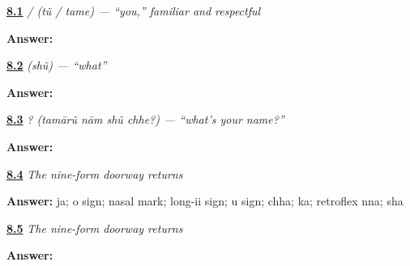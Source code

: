 \noindent\begin{minipage}[t]{\linewidth}
\raggedright
\hyperlink{review-GU-C02-tu-tame-ra-retrieval}{\textbf{8.1}} \emph{ /  (tũ / tame) — \textquotedblleft{}you,\textquotedblright{} familiar and respectful}\par
\small \textbf{Answer:} \par
\end{minipage}\par\medskip

\noindent\begin{minipage}[t]{\linewidth}
\raggedright
\hyperlink{review-GU-C02-shun-da-retrieval}{\textbf{8.2}} \emph{ (shũ) — \textquotedblleft{}what\textquotedblright{}}\par
\small \textbf{Answer:} \par
\end{minipage}\par\medskip

\noindent\begin{minipage}[t]{\linewidth}
\raggedright
\hyperlink{review-GU-C02-tamarun-naam-shun-chhe-va-retrieval}{\textbf{8.3}} \emph{   ? (tamārũ nām shũ chhe?) — \textquotedblleft{}what's your name?\textquotedblright{}}\par
\small \textbf{Answer:} \par
\end{minipage}\par\medskip

\noindent\begin{minipage}[t]{\linewidth}
\raggedright
\hyperlink{review-GU-R04-doorway-nine-r2-reading}{\textbf{8.4}} \emph{The nine-form doorway returns}\par
\small \textbf{Answer:} ja; o sign; nasal mark; long-ii sign; u sign; chha; ka; retroflex nna; sha\par
\end{minipage}\par\medskip

\noindent\begin{minipage}[t]{\linewidth}
\raggedright
\hyperlink{review-GU-R04-doorway-nine-r2-dictation}{\textbf{8.5}} \emph{The nine-form doorway returns}\par
\small \textbf{Answer:}         \par
\end{minipage}\par\medskip

